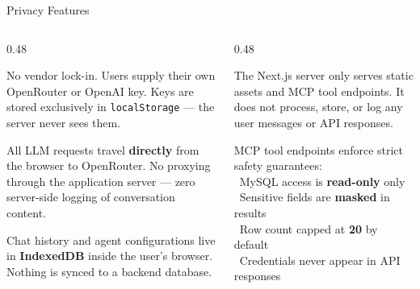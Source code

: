 \documentclass[aspectratio=169, 10pt]{beamer}
\begin{document}
\begin{frame}{Privacy Features}
  \begin{columns}[T]
    \begin{column}{0.48\textwidth}
      \begin{tcolorbox}[featurebox, title={\faKey\ \ User-provided API Keys}]
        \scriptsize
        No vendor lock-in. Users supply their own OpenRouter or OpenAI key.
        Keys are stored exclusively in \texttt{localStorage} — the server
        never sees them.
      \end{tcolorbox}\vspace{0.5em}

      \begin{tcolorbox}[featurebox, title={\faArrowsAltH\ \ Client-side API Calls}]
        \scriptsize
        All LLM requests travel \textbf{directly} from the browser to
        OpenRouter. No proxying through the application server — zero
        server-side logging of conversation content.
      \end{tcolorbox}\vspace{0.5em}

      \begin{tcolorbox}[featurebox, title={\faHdd\ \ Local Data Storage}]
        \scriptsize
        Chat history and agent configurations live in \textbf{IndexedDB}
        inside the user's browser. Nothing is synced to a backend database.
      \end{tcolorbox}
    \end{column}

    \begin{column}{0.48\textwidth}
      \begin{tcolorbox}[featurebox, title={\faServer\ \ No Server Processing}]
        \scriptsize
        The Next.js server only serves static assets and MCP tool endpoints.
        It does not process, store, or log any user messages or API
        responses.
      \end{tcolorbox}\vspace{0.5em}

      \begin{tcolorbox}[featurebox, title={\faShieldVirus\ \ Secured Tools}]
        \scriptsize
        MCP tool endpoints enforce strict safety guarantees:\\[3pt]
        \textbullet\ MySQL access is \textbf{read-only} only\\
        \textbullet\ Sensitive fields are \textbf{masked} in results\\
        \textbullet\ Row count capped at \textbf{20} by default\\
        \textbullet\ Credentials never appear in API responses
      \end{tcolorbox}
    \end{column}
  \end{columns}
\end{frame}
\end{document}
